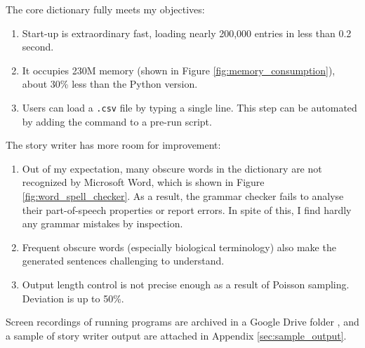 \documentclass[../main.tex]{subfiles}
\begin{document}
The core dictionary fully meets my objectives:

\begin{enumerate}
	\item Start-up is extraordinary fast, loading nearly 200,000 entries in less than 0.2 second.
	
	\item It occupies 230M memory (shown in Figure \ref{fig:memory_consumption}), about 30\% less than the Python version.
	
	\item Users can load a \texttt{.csv} file by typing a single line. This step can be automated by adding the command to a pre-run script.
\end{enumerate}

The story writer has more room for improvement:

\begin{enumerate}
	\item Out of my expectation, many obscure words in the dictionary are not recognized by Microsoft Word, which is shown in Figure \ref{fig:word_spell_checker}. As a result, the grammar checker fails to analyse their part-of-speech properties or report errors. In spite of this, I find hardly any grammar mistakes by inspection.
	
	\item Frequent obscure words (especially biological terminology) also make the generated sentences challenging to understand.
	
	\item Output length control is not precise enough as a result of Poisson sampling. Deviation is up to 50\%.
\end{enumerate}

Screen recordings of running programs are archived in a Google Drive folder \cite{bib:engsci_press_media}, and a sample of story writer output are attached in Appendix \ref{sec:sample_output}.
\end{document}
